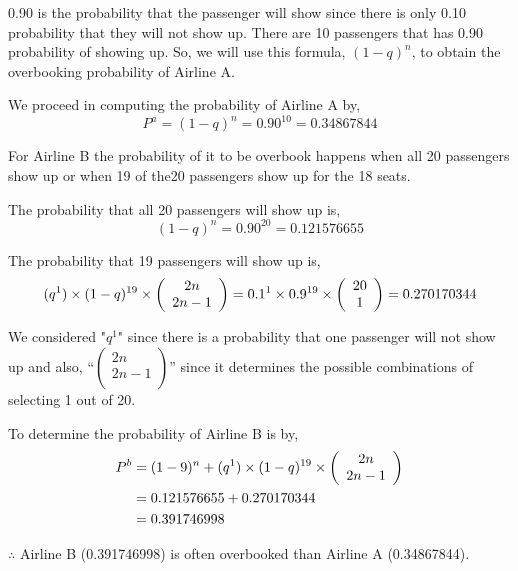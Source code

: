 \documentclass[12pt,letterpaper]{article}
\begin{document}
\begin{enumerate}[label=\Alph*]
        0.90 is the probability that the passenger will show since there is only 0.10 probability that they will not show up. There are 10 passengers that has 0.90 probability of showing up. So, we will use this formula, $(1-q)^n$, to obtain the overbooking probability of Airline A.

        We proceed in computing the probability of Airline A by,
        \begin{equation*}
          P^a = (1-q)^n = 0.90^{10} = 0.34867844
        \end{equation*}

        For Airline B the probability of it to be overbook happens when all 20 passengers show up or when 19 of the20 passengers show up for the 18 seats.

        The probability that all 20 passengers will show up is,
        \begin{equation*}
          (1-q)^n=0.90^{20} = 0.121576655
        \end{equation*}

        The probability that 19 passengers will show up is,
        \begin{equation*}
          (q^1) \times (1-q)^{19} \times 
            \left( {\begin{array}{*{20}c}
               2n  \\
               2n-1  \\
            \end{array}} \right)
             = 0.1^1 \times 0.9^{19} \times 
             \left( {\begin{array}{*{20}c}
              20  \\
              1  \\
           \end{array}} \right)
            = 0.270170344
        \end{equation*}
        
        We considered  "$q^1$" since there is a probability that one passenger will not show up and also, {\footnotesize “$\left( {\begin{array}{c}
          2n  \\
          2n-1  \\
       \end{array}} \right)$”} since it determines the possible combinations of selecting 1 out of 20. 

       To determine the probability of Airline B is by,
       \begin{align*}
         P^b &= (1-9)^n + (q^1) \times (1-q)^{19} \times 
         \left( {\begin{array}{*{20}c}
          2n  \\
          2n-1  \\
          \end{array}} \right)\\
          &= 0. 121576655 + 0 .270170344\\
          &= 0.391746998
       \end{align*}

       $\therefore$ Airline B (0.391746998) is often overbooked than Airline A (0.34867844).
    \end{enumerate}
\end{document}

